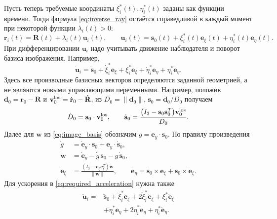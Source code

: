 \documentclass[a4paper,12pt]{article}
\begin{document}
Пусть теперь требуемые координаты $\xi_i^*(t),\eta_i^*(t)$ заданы как функции времени. Тогда формула \eqref{eq:inverse_ray} остаётся справедливой в каждый момент при некоторой функции $\lambda_i(t)>0$:
\begin{equation}
    \mathbf r_i(t)=\mathbf R(t)+\lambda_i(t)\mathbf u_i(t),
    \qquad
    \mathbf u_i(t)=\mathbf s_0(t)+\xi_i^*(t)\mathbf e_\xi(t)
                             +\eta_i^*(t)\mathbf e_\eta(t).
    \label{eq:kinematic_trajectory}
\end{equation}
При дифференцировании $\mathbf u_i$ надо учитывать движение наблюдателя и поворот базиса изображения. Например,
\begin{equation}
    \dot{\mathbf u}_i=\dot{\mathbf s}_0
        +\dot\xi_i^*\mathbf e_\xi+\xi_i^*\dot{\mathbf e}_\xi
        +\dot\eta_i^*\mathbf e_\eta+\eta_i^*\dot{\mathbf e}_\eta.
    \label{eq:direction_derivative}
\end{equation}
Здесь все производные базисных векторов определяются заданной
геометрией, а не являются новыми управляющими переменными.
Например, положив
$\mathbf d_0=\mathbf r_0-\mathbf R$ и
$\mathbf v_0^{\rm los}=\dot{\mathbf r}_0-\dot{\mathbf R}$,
из $D_0=\|\mathbf d_0\|$, $\mathbf s_0=\mathbf d_0/D_0$
получаем
\begin{equation}
 \dot D_0=\mathbf s_0\cdot\mathbf v_0^{\rm los},\qquad
 \dot{\mathbf s}_0=
 \frac{\bigl(I_3-\mathbf s_0\mathbf s_0^T\bigr)
                  \mathbf v_0^{\rm los}}{D_0}.
 \label{eq:sight_derivative}
\end{equation}
Далее для $\mathbf w$ из \eqref{eq:image_basis} обозначим
$g=\mathbf e_y\cdot\mathbf s_0$. По правилу произведения
\begin{equation}
\begin{aligned}
 \dot g&=\dot{\mathbf e}_y\cdot\mathbf s_0+
                  \mathbf e_y\cdot\dot{\mathbf s}_0,\\
 \dot{\mathbf w}&=\dot{\mathbf e}_y-\dot g\,\mathbf s_0
                                -g\,\dot{\mathbf s}_0,\\
 \dot{\mathbf e}_\xi
   &=\frac{(I_3-\mathbf e_\xi\mathbf e_\xi^T)
                   \dot{\mathbf w}}{\|\mathbf w\|},\qquad
 \dot{\mathbf e}_\eta
   =\dot{\mathbf s}_0\times\mathbf e_\xi
                   +\mathbf s_0\times\dot{\mathbf e}_\xi .
\end{aligned}
\label{eq:image_basis_derivative}
\end{equation}
Для ускорения в \eqref{eq:required_acceleration} нужна также
\begin{equation}
\begin{aligned}
 \ddot{\mathbf u}_i={}&\ddot{\mathbf s}_0
   +\ddot\xi_i^*\mathbf e_\xi
   +2\dot\xi_i^*\dot{\mathbf e}_\xi
   +\xi_i^*\ddot{\mathbf e}_\xi\\
   &+\ddot\eta_i^*\mathbf e_\eta
   +2\dot\eta_i^*\dot{\mathbf e}_\eta
   +\eta_i^*\ddot{\mathbf e}_\eta.
\end{aligned}
\label{eq:direction_second_derivative}
\end{equation}
\end{document}
